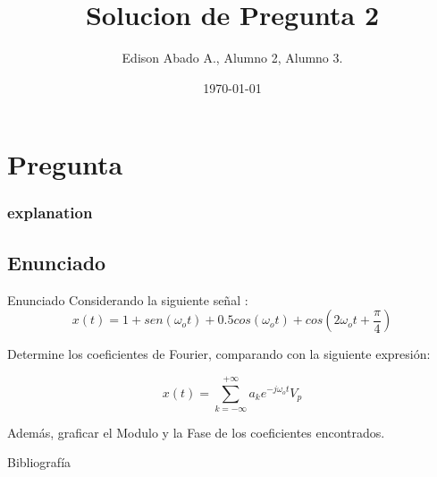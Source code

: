 \documentclass[aspectratio=169, 8pt]{beamer}
\title[Señales y Sistemas]{Solucion de Pregunta 2} %
\author{Edison Abado A., Alumno 2, Alumno 3.} %
\institute[UNSAAC] %
{
	\begin{figure}[hbtp]
		\centering
		\texttt{[image: IMAGENES/escudo b]}
	\end{figure}

}
\date{\today} %
\begin{document}
\begin{frame}
\titlepage %
\end{frame}




\section{Pregunta}
\frametitle{explanation}
\begin{frame}
\subsection{Enunciado}

\begin{exampleblock}{Enunciado}
	Considerando la siguiente señal \cite{Oppenheim}:
	\begin{equation}
		x(t) = 1 + sen(\omega_o t) + 0.5cos (\omega_o t) + cos\left(2 \omega_o t + \frac{\pi}{4}\right)
		\label{ec1}
	\end{equation}
	
	Determine los coeficientes de Fourier, comparando con la siguiente expresión:
	
	\begin{equation}
		x(t)=\sum_{k=-\infty}^{+ \infty} a_k e^{-j\omega_ot} V_p
	\end{equation}
	
	Además, graficar el Modulo y la Fase de los coeficientes encontrados.
\end{exampleblock}
\end{frame}



\begin{frame}{Bibliografía}
	
	
\end{frame}
\end{document}
